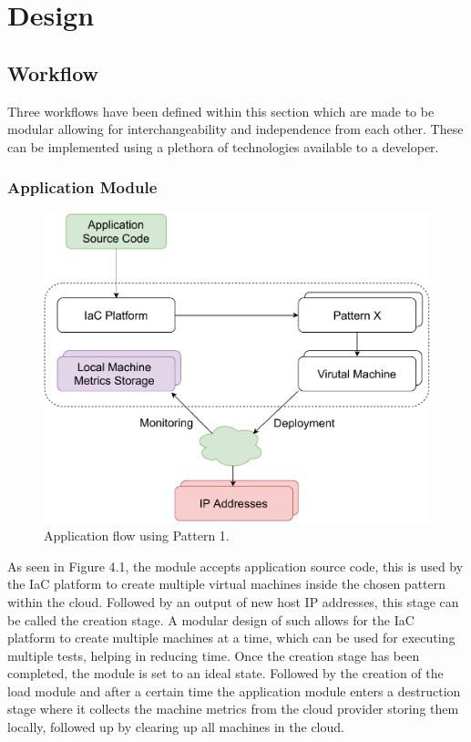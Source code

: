 \chapter{Design}
\section{Workflow}
Three workflows have been defined within this section which are made to be modular allowing for interchangeability and independence from each other. These can be implemented using a plethora of technologies available to a developer.
\subsection{Application Module}
\begin{figure}[H]
    \centering
    \includegraphics[width=0.7\linewidth]{images/Modular_Application.pdf}
    \caption{Application flow using Pattern 1.}
\end{figure} 

As seen in Figure 4.1, the module accepts application source code, this is used by the IaC platform to create multiple virtual machines inside the chosen pattern within the cloud. Followed by an output of new host IP addresses, this stage can be called the creation stage. A modular design of such allows for the IaC platform to create multiple machines at a time, which can be used for executing multiple tests, helping in reducing time. Once the creation stage has been completed, the module is set to an ideal state. Followed by the creation of the load module and after a certain time the application module enters a destruction stage where it collects the machine metrics from the cloud provider storing them locally, followed up by clearing up all machines in the cloud. 

